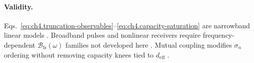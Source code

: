\paragraph{Validity.}
Eqs.~\eqref{eq:ch4.truncation-observables}--\eqref{eq:ch4.capacity-saturation} are narrowband linear models \cite{stratton1941}. Broadband pulses and
nonlinear receivers require frequency-dependent \(\mathcal{B}_{\mathrm{fs}}(\omega)\) families not developed here \cite{jackson1999,harrington2001,devaney2004}.
Mutual coupling modifies \(\sigma_{n}\) ordering without removing capacity knees tied to \(d_{\mathrm{eff}}\) \cite{hansen1988,collin2001}.
